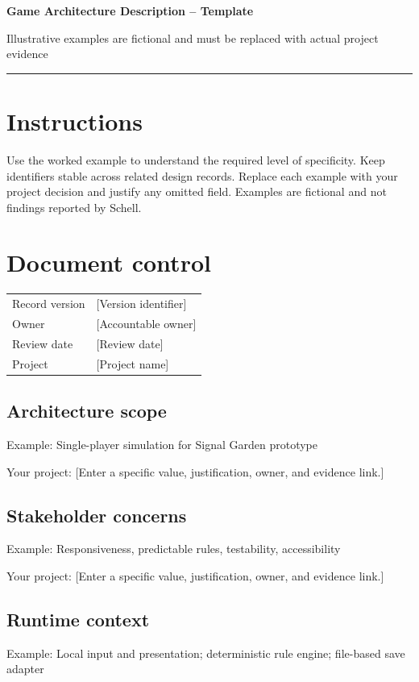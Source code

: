 \documentclass[11pt]{article}
\begin{document}
{\huge\bfseries\color{suiteblue} Game Architecture Description -- Template}\par
\vspace{0.15in}
{\normalsize\color{suitegray} Illustrative examples are fictional and must be replaced with actual project evidence}\par
\vspace{0.15in}\hrule\vspace{0.15in}

\section{Instructions}
Use the worked example to understand the required level of specificity. Keep identifiers stable across related design records. Replace each example with your project decision and justify any omitted field. Examples are fictional and not findings reported by Schell.


\section{Document control}
\begin{tabularx}{\linewidth}{@{}lX@{}}\toprule Record version & [Version identifier]\\ Owner & [Accountable owner]\\ Review date & [Review date]\\ Project & [Project name]\\\bottomrule\end{tabularx}

\subsection{Architecture scope}
Example: Single-player simulation for Signal Garden prototype

Your project: [Enter a specific value, justification, owner, and evidence link.]


\subsection{Stakeholder concerns}
Example: Responsiveness, predictable rules, testability, accessibility

Your project: [Enter a specific value, justification, owner, and evidence link.]


\subsection{Runtime context}
Example: Local input and presentation; deterministic rule engine; file-based save adapter
\end{document}
